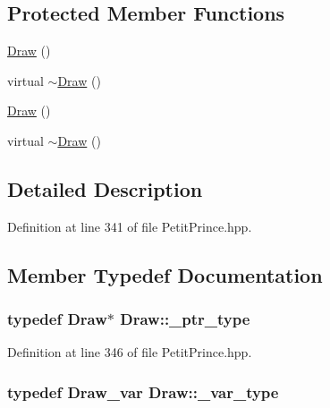 \subsection*{Protected Member Functions}
\begin{DoxyCompactItemize}
\item 
\hyperlink{class_draw_a7c808e2194e8659b401584773e26730e}{Draw} ()
\item 
virtual \hyperlink{class_draw_a9c2feb77460265c202c60772ae05656a}{$\sim$\+Draw} ()
\item 
\hyperlink{class_draw_a7c808e2194e8659b401584773e26730e}{Draw} ()
\item 
virtual \hyperlink{class_draw_a9c2feb77460265c202c60772ae05656a}{$\sim$\+Draw} ()
\end{DoxyCompactItemize}


\subsection{Detailed Description}


Definition at line 341 of file Petit\+Prince.\+hpp.



\subsection{Member Typedef Documentation}
\subsubsection[{\texorpdfstring{\+\_\+ptr\+\_\+type}{_ptr_type}}]{\setlength{\rightskip}{0pt plus 5cm}typedef {\bf Draw}$\ast$ {\bf Draw\+::\+\_\+ptr\+\_\+type}}\hypertarget{class_draw_a5164256572b3c4123ceecd1897c248dd}{}\label{class_draw_a5164256572b3c4123ceecd1897c248dd}


Definition at line 346 of file Petit\+Prince.\+hpp.

\subsubsection[{\texorpdfstring{\+\_\+var\+\_\+type}{_var_type}}]{\setlength{\rightskip}{0pt plus 5cm}typedef {\bf Draw\+\_\+var} {\bf Draw\+::\+\_\+var\+\_\+type}}\hypertarget{class_draw_a0ef4fbc763491a2013fa08badb5ee934}{}\label{class_draw_a0ef4fbc763491a2013fa08badb5ee934}


